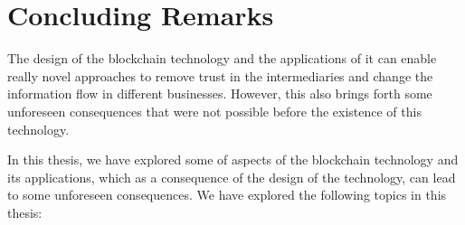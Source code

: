 \chapter{Concluding Remarks} \label{sec:conclusion}


The design of the blockchain technology and the applications of it can enable really novel approaches to remove trust in the intermediaries and change the information flow in different businesses. However, this also brings forth some unforeseen consequences that were not possible before the existence of this technology.

In this thesis, we have explored some of aspects of the blockchain technology and its applications, which as a consequence of the design of the technology, can lead to some unforeseen consequences. We have explored the following topics in this thesis:  


